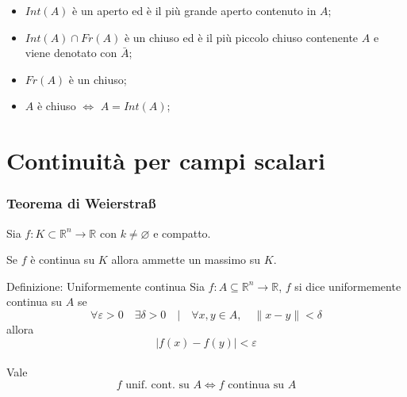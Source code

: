 \documentclass[x11names]{article}
\begin{document}
\begin{itemize}
	\item	\(Int(A)\) è un aperto ed è il più grande aperto contenuto in \(A\);
	\item   \(Int(A) \cap Fr(A)\) è un chiuso ed è il più piccolo chiuso contenente \(A\) e viene denotato con \(\bar{A}\);
	\item   \(Fr(A)\) è un chiuso;
	\item \(A\) è chiuso \(\Longleftrightarrow\) \(A = Int(A)\);
\end{itemize}



\section{Continuità per campi scalari}

	\begin{center}
		\colorbox{myred}{\begin{minipage}{5.75in}
				\begin{redes}{}
					\subsubsection{Teorema di Weierstra{\ss}}
					Sia \(f:K\subset \mathbb{R}^n \to \mathbb{R}\) con \(k\neq \varnothing\) e compatto.
					
					Se \(f\) è continua su \(K\) allora ammette un massimo su \(K\).
				\end{redes}
		\end{minipage}}        
	\end{center}

	\begin{center}
		\colorbox{myblue}{\begin{minipage}{5.75in}
				\begin{blues}{Definizione: Uniformemente continua}
					Sia \(f:A\subseteq \mathbb{R}^n  \to \mathbb{R}\), \(f\) si dice uniformemente continua su \(A\) se
					\[ 
						\forall \varepsilon  > 0 \quad \exists \delta > 0 \quad | \quad \forall x,y \in A, \quad \|x-y\| < \delta
					\]
					allora 
					\[ 
					|f(x) - f(y)| < \varepsilon
					\] \\
					
					Vale 
					\[ 
					f \text{ unif. cont. su } A \Longleftrightarrow f \text{ continua su } A
					\]
				\end{blues}
		\end{minipage}}       
	\end{center}
\end{document}
